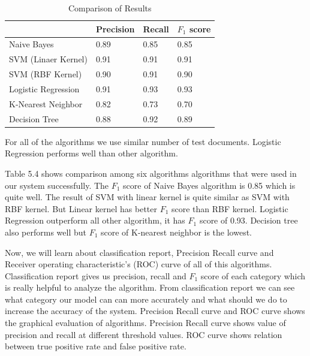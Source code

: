 \begin{table}[h!]
\begin{center}
\caption{Comparison of Results}
\begin{tabular}{|m{6.8cm} | m{2cm}| m{2cm}| m{2cm}|}
\hline
     & Precision & Recall & $F_1$ score \\
\hline
    Naive Bayes & 0.89 & 0.85 & 0.85\\
\hline 
    SVM (Linaer Kernel) & 0.91 & 0.91 & 0.91\\
\hline 
    SVM (RBF Kernel) & 0.90 & 0.91 & 0.90\\
\hline 
    Logistic Regression & 0.91 & 0.93 & 0.93\\
\hline
    K-Nearest Neighbor & 0.82 & 0.73 & 0.70\\
\hline
    Decision Tree & 0.88 & 0.92 & 0.89\\
\hline
\end{tabular}
\end{center}
\end{table}
\noindent
For all of the algorithms we use similar number of test documents. Logistic Regression performs well than other algorithm.
\par
\vspace{0.5cm}
\noindent
Table 5.4 shows comparison among six algorithms algorithms that were used in our system successfully. The $F_1$ score of Naive Bayes algorithm is 0.85 which is quite well. The result of SVM with linear kernel is quite similar as SVM with RBF kernel. But Linear kernel has better $F_1$ score than RBF kernel. Logistic Regression outperform all other algorithm, it has $F_1$ score of 0.93. Decision tree also performs well but $F_1$ score of K-nearest neighbor is the lowest.

\par
\vspace{0.5cm}
\noindent
Now, we will learn about classification report, Precision Recall curve and Receiver operating characteristic's (ROC) curve of  all of this algorithms. Classification report gives us precision, recall and $F_1$ score of each category which is really helpful to analyze the algorithm. From classification report we can see what category our model can can more accurately and what should we do to increase the accuracy of the system. Precision Recall curve and ROC curve shows the graphical evaluation of algorithms. Precision Recall curve shows value of precision and recall at different threshold values. ROC curve shows relation between true positive rate and false positive rate. 
\clearpage

